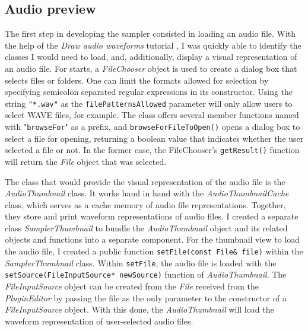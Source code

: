 \documentclass[12pt, a4paper, hidelinks]{article}
\begin{document}
	
	\newpage	
	\subsection{Audio preview}
	
	The first step in developing the sampler consisted in loading an audio file. With the help of the \textit{Draw audio waveforms} tutorial \cite{audiothumbnail}, I was quickly able to identify the classes I would need to load, and, additionally, display a visual representation of an audio file. For starts, a \textit{FileChooser} object is used to create a dialog box that selects files or folders. One can limit the formats allowed for selection by specifying semicolon separated regular expressions in its constructor. Using the string \texttt{"*.wav"} as the \texttt{filePatternsAllowed} parameter will only allow users to select WAVE files, for example. The class offers several member functions named with "\texttt{browseFor}" as a prefix, and \texttt{browseForFileToOpen()} opens a dialog box to select a file for opening, returning a boolean value that indicates whether the user selected a file or not. In the former case, the FileChooser's \texttt{getResult()} function will return the \textit{File} object that was selected. \par
	The class that would provide the visual representation of the audio file is the \textit{AudioThumbnail} class. It works hand in hand with the \textit{AudioThumbnailCache} class, which serves as a cache memory of audio file representations. Together, they store and print waveform representations of audio files. I created a separate class \textit{SamplerThumbnail} to bundle the \textit{AudioThumbnail} object and its related objects and functions into a separate component. For the thumbnail view to load the audio file, I created a public function \texttt{setFile(const File\& file)} within the \textit{SamplerThumbnail} class. Within \texttt{setFile}, the audio file is loaded with the \texttt{setSource(FileInputSource* newSource)} function of \textit{AudioThumbnail}. The \textit{FileInputSource} object can be created from the \textit{File} received from the \textit{PluginEditor} by passing the file as the only parameter to the constructor of a \textit{FileInputSource} object. With this done, the \textit{AudioThumbnail} will load the waveform representation of user-selected audio files.\par
	
\end{document}
